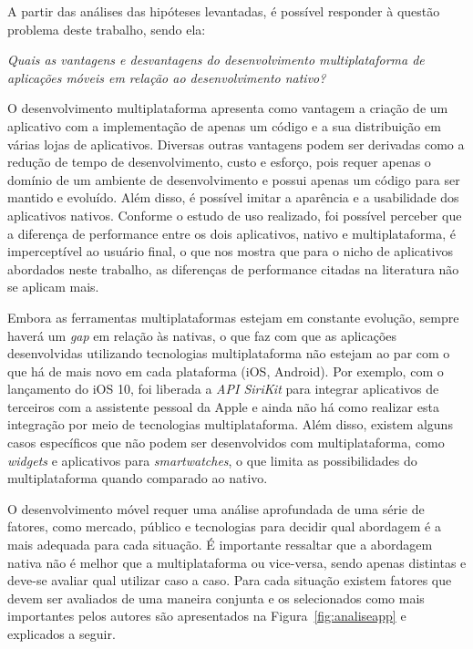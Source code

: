 A partir das análises das hipóteses levantadas, é possível responder à questão problema deste trabalho, sendo ela:
\begin{center}
    \textit{Quais as vantagens e desvantagens do desenvolvimento multiplataforma de aplicações móveis em relação ao desenvolvimento nativo?}
\end{center}

O desenvolvimento multiplataforma apresenta como vantagem a criação de um aplicativo com a implementação de apenas um código e a sua distribuição em várias lojas de aplicativos. Diversas outras vantagens podem ser 
derivadas como a redução de tempo de desenvolvimento, custo e esforço, pois requer apenas o domínio de um ambiente de desenvolvimento e possui apenas um código para ser mantido e evoluído. Além disso, é possível imitar 
a aparência e a usabilidade dos aplicativos nativos. Conforme o estudo de uso realizado, foi possível perceber que a diferença de performance entre os dois aplicativos, nativo e multiplataforma, é imperceptível ao usuário 
final, o que nos mostra que para o nicho de aplicativos abordados neste trabalho, as diferenças de performance citadas na literatura não se aplicam mais.

Embora as ferramentas multiplataformas estejam em constante evolução, sempre haverá um \textit{gap} em relação às nativas, o que faz com que as aplicações desenvolvidas utilizando tecnologias multiplataforma não estejam 
ao par com o que há de mais novo em cada plataforma (iOS, Android). Por exemplo, com o lançamento do iOS 10, foi liberada a \textit{API SiriKit} para integrar aplicativos de terceiros com a assistente pessoal da Apple e 
ainda não há como realizar esta integração por meio de tecnologias multiplataforma. Além disso, existem alguns casos específicos que não podem ser desenvolvidos com multiplataforma, como \textit{widgets} e aplicativos para 
\textit{smartwatches}, o que limita as possibilidades do multiplataforma quando comparado ao nativo.

O desenvolvimento móvel requer uma análise aprofundada de uma série de fatores, como mercado, público e tecnologias para decidir qual abordagem é a mais adequada para cada situação.
É importante ressaltar que a abordagem nativa não é melhor que a multiplataforma ou vice-versa, sendo apenas distintas e deve-se avaliar qual utilizar caso a 
caso. Para cada situação existem fatores que devem ser avaliados de uma maneira conjunta e os selecionados como mais importantes pelos autores são apresentados na Figura~\ref{fig:analiseapp} e explicados a seguir.

